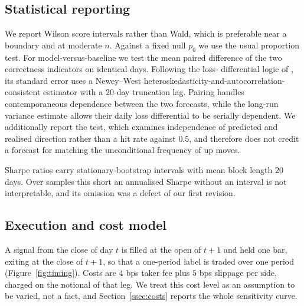 \documentclass[preprint,12pt,authoryear]{elsarticle}
\begin{document}
\subsection{Statistical reporting}

We report Wilson score intervals rather than Wald, which is preferable near a
boundary and at moderate $n$. Against a fixed null $p_0$ we use the usual
proportion test. For model-versus-baseline we test the mean paired difference of
the two correctness indicators on identical days. Following the loss-
differential logic of \citet{diebold1995comparing}, its standard error uses a
Newey--West heteroskedasticity-and-autocorrelation-consistent estimator with a
20-day truncation lag. Pairing handles contemporaneous dependence between the
two forecasts, while the long-run variance estimate allows their daily loss
differential to be serially dependent. We additionally report the
\citet{pesaran1992simple} test,
which examines independence of predicted and realised direction rather than a hit
rate against $0.5$, and therefore does not credit a forecast for matching the
unconditional frequency of up moves.

Sharpe ratios carry stationary-bootstrap intervals \citep{politis1994stationary}
with mean block length $20$ days. Over samples this short an annualised Sharpe
without an interval is not interpretable, and its omission was a defect of our
first revision.

\subsection{Execution and cost model}

A signal from the close of day $t$ is filled at the open of $t+1$ and held one
bar, exiting at the close of $t+1$, so that a one-period label is traded over one
period (Figure~\ref{fig:timing}). Costs are $4$ bps taker fee plus $5$ bps
slippage per side, charged on the notional of that leg. We treat this cost level
as an assumption to be varied, not a fact, and Section~\ref{ssec:costs} reports
the whole sensitivity curve.
\end{document}
